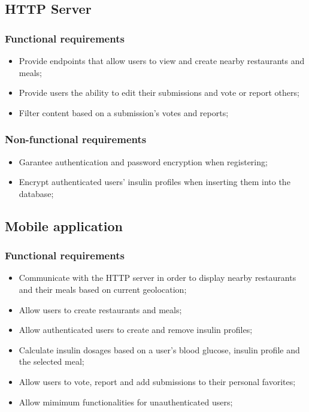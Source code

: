 \subsection{HTTP Server}

\subsubsection{Functional requirements}

\begin{itemize}
    \item Provide endpoints that allow users to view and create nearby restaurants and meals;
    \item Provide users the ability to edit their submissions and vote or report others;
    \item Filter content based on a submission's votes and reports;
\end{itemize}

\subsubsection{Non-functional requirements}

\begin{itemize}
    \item Garantee authentication and password encryption when registering;
    \item Encrypt authenticated users' insulin profiles when inserting them into the database;
\end{itemize}

\subsection{Mobile application}

\subsubsection{Functional requirements}

\begin{itemize}
    \item Communicate with the HTTP server in order to display nearby restaurants and their meals based on current geolocation;
    \item Allow users to create restaurants and meals;
    \item Allow authenticated users to create and remove insulin profiles;
    \item Calculate insulin dosages based on a user's blood glucose, insulin profile and the selected meal;
    \item Allow users to vote, report and add submissions to their personal favorites;
    \item Allow mimimum functionalities for unauthenticated users;
\end{itemize}

